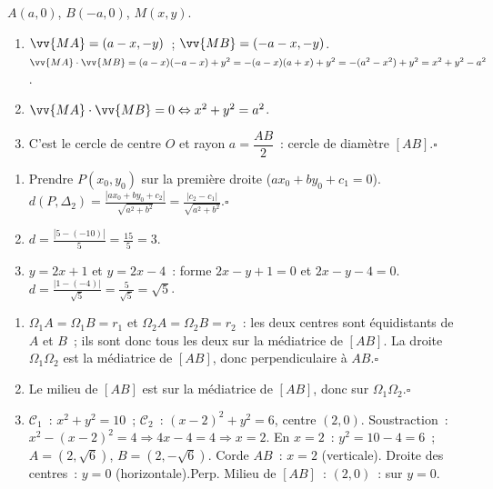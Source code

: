 
$A(a,0)$, $B(-a,0)$, $M(x,y)$.
\begin{enumerate}
  \item $\vv{MA}=(a-x,-y)$~; $\vv{MB}=(-a-x,-y)$.
        $\vv{MA}\cdot\vv{MB}=(a-x)(-a-x)+y^2=-(a-x)(a+x)+y^2=-(a^2-x^2)+y^2=x^2+y^2-a^2$.
  \item $\vv{MA}\cdot\vv{MB}=0\Leftrightarrow x^2+y^2=a^2$.
  \item C'est le cercle de centre $O$ et rayon $a=\dfrac{AB}{2}$~: cercle de diam\`etre $[AB]$.\hfill$\square$
\end{enumerate}


\begin{enumerate}
  \item Prendre $P(x_0,y_0)$ sur la premi\`ere droite ($ax_0+by_0+c_1=0$).
        $d(P,\Delta_2)=\frac{|ax_0+by_0+c_2|}{\sqrt{a^2+b^2}}=\frac{|c_2-c_1|}{\sqrt{a^2+b^2}}$.\hfill$\square$
  \item $d=\frac{|5-(-10)|}{5}=\frac{15}{5}=3$.
  \item $y=2x+1$ et $y=2x-4$~: forme $2x-y+1=0$ et $2x-y-4=0$.
        $d=\frac{|1-(-4)|}{\sqrt{5}}=\frac{5}{\sqrt{5}}=\sqrt{5}$.
\end{enumerate}


\begin{enumerate}
  \item $\Omega_1A=\Omega_1B=r_1$ et $\Omega_2A=\Omega_2B=r_2$~:
        les deux centres sont \'equidistants de $A$ et $B$~; ils sont donc tous les deux sur la
        m\'ediatrice de $[AB]$. La droite $\Omega_1\Omega_2$ est la m\'ediatrice de $[AB]$,
        donc perpendiculaire \`a $AB$.\hfill$\square$
  \item Le milieu de $[AB]$ est sur la m\'ediatrice de $[AB]$, donc sur $\Omega_1\Omega_2$.\hfill$\square$
  \item $\mathcal{C}_1$~: $x^2+y^2=10$~; $\mathcal{C}_2$~: $(x-2)^2+y^2=6$, centre $(2,0)$.
        Soustraction~: $x^2-(x-2)^2=4\Rightarrow4x-4=4\Rightarrow x=2$.
        En $x=2$~: $y^2=10-4=6$~; $A=(2,\sqrt{6})$, $B=(2,-\sqrt{6})$.
        Corde $AB$~: $x=2$ (verticale). Droite des centres~: $y=0$ (horizontale).\checkmark\quad Perp.
        Milieu de $[AB]$~: $(2,0)$~: sur $y=0$.\checkmark
\end{enumerate}

